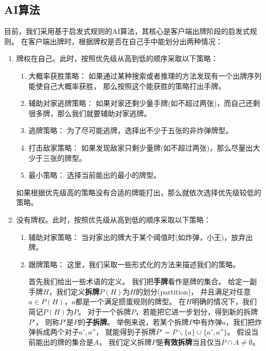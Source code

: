\documentclass[a4paper]{ctexart}
\begin{document}
\subsection{AI算法} \label{subsec:ai-alg}
目前，我们采用基于启发式规则的AI算法，其核心是客户端出牌阶段的启发式规则。
在客户端出牌时，根据牌权是否在自己手中能划分出两种情况：
\begin{enumerate}
  \item 牌权在自己。此时，按照优先级从高到低的顺序采取以下策略：
  \begin{enumerate}
    \item 大概率获胜策略：
    如果通过某种搜索或者推理的方法发现有一个出牌序列能使自己大概率获胜，
    那么按照这个能获胜的策略打出手牌。

    \item 辅助对家逃牌策略：
    如果对家还剩少量手牌(如不超过两张)，而自己还剩很多牌，那么我们就要辅助对家逃牌。

    \item 逃牌策略：
    为了尽可能逃牌，选择出不少于五张的非炸弹牌型。

    \item 打击敌家策略：
    如果发现敌家只剩少量牌(如不超过两张)，那么尽量出大少于三张的牌型。

    \item 最小策略：
    选择当前能出的最小的牌型。
  \end{enumerate}
  如果根据优先级高的策略没有合适的牌能打出，那么就依次选择优先级较低的策略。

  \item 没有牌权。此时，按照优先级从高到低的顺序采取以下策略：
  \begin{enumerate}
    \item 辅助对家策略：
    当对家出的牌大于某个阈值时(如炸弹，小王)，放弃出牌。

    \item 跟牌策略：
    这里，我们采取一些形式化的方法来描述我们的策略。

    首先我们给出一些术语的定义。
    我们把\textbf{手牌}看作是牌的集合。
    给定一副手牌$H$，我们定义\textbf{拆牌}$P(H)$为$H$的划分(partition)，
    并且满足对任意$a \in P(H)$，$a$都是一个满足掼蛋规则的牌型。
    在$H$明确的情况下，我们简记$P(H)$为$P$。
    对于一个拆牌$P$，若能把它进一步划分，得到新的拆牌$P'$，
    则称$P'$是$P$的\textbf{子拆牌}。
    举例来说，若某个拆牌$P$中有炸弹$a$，我们把炸弹拆成两个对子$a',a''$，
    就能得到子拆牌$P'=P\backslash\{a\}\cup\{a',a''\}$。
    假设当前能出的牌的集合是$A$，
    我们定义拆牌$P$是\textbf{有效拆牌}当且仅当$P\cap A\neq \emptyset$。
 

\end{enumerate}
\end{enumerate}
\end{document}
